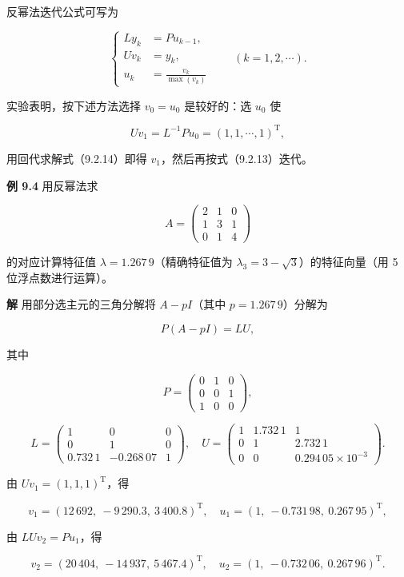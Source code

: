 反幂法迭代公式可写为

\[
\left\{
\begin{aligned}
Ly_k&=Pu_{k-1},\\
Uv_k&=y_k,\\
u_k&=\frac{v_k}{\max(v_k)}
\end{aligned}
\right.\qquad(k=1,2,\cdots).
\tag{9.2.13}
\]

实验表明，按下述方法选择 \(v_0=u_0\) 是较好的：选 \(u_0\) 使

\[
Uv_1=L^{-1}Pu_0=(1,1,\cdots,1)^{\mathrm T},
\tag{9.2.14}
\]

用回代求解式（9.2.14）即得 \(v_1\)，然后再按式（9.2.13）迭代。

\textbf{例 9.4} 用反幂法求

\[
A=\begin{pmatrix}
2&1&0\\
1&3&1\\
0&1&4
\end{pmatrix}
\]

的对应计算特征值 \(\lambda=1.267\,9\)（精确特征值为 \(\lambda_3=3-\sqrt3\)）的特征向量（用 5 位浮点数进行运算）。

\textbf{解} 用部分选主元的三角分解将 \(A-pI\)（其中 \(p=1.267\,9\)）分解为

\[
P(A-pI)=LU,
\]

其中

\[
P=\begin{pmatrix}
0&1&0\\
0&0&1\\
1&0&0
\end{pmatrix},
\]

\[
L=\begin{pmatrix}
1&0&0\\
0&1&0\\
0.732\,1&-0.268\,07&1
\end{pmatrix},\quad
U=\begin{pmatrix}
1&1.732\,1&1\\
0&1&2.732\,1\\
0&0&0.294\,05\times10^{-3}
\end{pmatrix}.
\]

由 \(Uv_1=(1,1,1)^{\mathrm T}\)，得

\[
v_1=(12\,692,\ -9\,290.3,\ 3\,400.8)^{\mathrm T},\quad
u_1=(1,\ -0.731\,98,\ 0.267\,95)^{\mathrm T},
\]

由 \(LUv_2=Pu_1\)，得

\[
v_2=(20\,404,\ -14\,937,\ 5\,467.4)^{\mathrm T},\quad
u_2=(1,\ -0.732\,06,\ 0.267\,96)^{\mathrm T}.
\]

